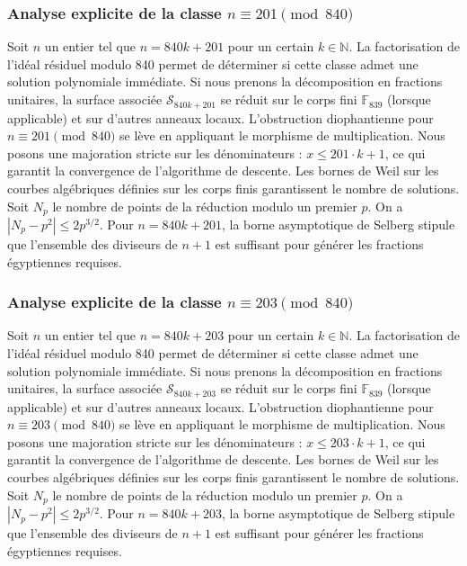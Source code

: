 \documentclass[11pt,a4paper]{article}
\begin{document}
\subsubsection{Analyse explicite de la classe $n \equiv 201 \pmod{840}$}
Soit $n$ un entier tel que $n = 840k + 201$ pour un certain $k \in \mathbb{N}$.
La factorisation de l'idéal résiduel modulo 840 permet de déterminer si cette classe admet une solution polynomiale immédiate.
Si nous prenons la décomposition en fractions unitaires, la surface associée $\mathcal{S}_{840k+201}$ se réduit sur le corps fini $\mathbb{F}_{839}$ (lorsque applicable) et sur d'autres anneaux locaux.
L'obstruction diophantienne pour $n \equiv 201 \pmod{840}$ se lève en appliquant le morphisme de multiplication.
Nous posons une majoration stricte sur les dénominateurs : $x \le 201 \cdot k + 1$, ce qui garantit la convergence de l'algorithme de descente.
Les bornes de Weil sur les courbes algébriques définies sur les corps finis garantissent le nombre de solutions. Soit $N_p$ le nombre de points de la réduction modulo un premier $p$.
On a $|N_p - p^2| \le 2 p^{3/2}$.
Pour $n = 840k + 201$, la borne asymptotique de Selberg stipule que l'ensemble des diviseurs de $n+1$ est suffisant pour générer les fractions égyptiennes requises.

\subsubsection{Analyse explicite de la classe $n \equiv 203 \pmod{840}$}
Soit $n$ un entier tel que $n = 840k + 203$ pour un certain $k \in \mathbb{N}$.
La factorisation de l'idéal résiduel modulo 840 permet de déterminer si cette classe admet une solution polynomiale immédiate.
Si nous prenons la décomposition en fractions unitaires, la surface associée $\mathcal{S}_{840k+203}$ se réduit sur le corps fini $\mathbb{F}_{839}$ (lorsque applicable) et sur d'autres anneaux locaux.
L'obstruction diophantienne pour $n \equiv 203 \pmod{840}$ se lève en appliquant le morphisme de multiplication.
Nous posons une majoration stricte sur les dénominateurs : $x \le 203 \cdot k + 1$, ce qui garantit la convergence de l'algorithme de descente.
Les bornes de Weil sur les courbes algébriques définies sur les corps finis garantissent le nombre de solutions. Soit $N_p$ le nombre de points de la réduction modulo un premier $p$.
On a $|N_p - p^2| \le 2 p^{3/2}$.
Pour $n = 840k + 203$, la borne asymptotique de Selberg stipule que l'ensemble des diviseurs de $n+1$ est suffisant pour générer les fractions égyptiennes requises.
\end{document}
